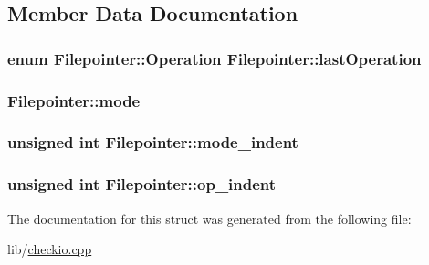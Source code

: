 \subsection{Member Data Documentation}
\hypertarget{struct_filepointer_af2d4dd45b988821f27c727858efda2a5}{
\subsubsection[{last\-Operation}]{\setlength{\rightskip}{0pt plus 5cm}enum {\bf Filepointer\-::\-Operation}  Filepointer\-::last\-Operation}}\label{struct_filepointer_af2d4dd45b988821f27c727858efda2a5}
\hypertarget{struct_filepointer_a56618b53461d3cc5281f8f2750bf109e}{
\subsubsection[{mode}]{ Filepointer\-::mode}}\label{struct_filepointer_a56618b53461d3cc5281f8f2750bf109e}
\hypertarget{struct_filepointer_af42d237df842da4a07835a7762c0ac93}{
\subsubsection[{mode\-\_\-indent}]{\setlength{\rightskip}{0pt plus 5cm}unsigned int Filepointer\-::mode\-\_\-indent}}\label{struct_filepointer_af42d237df842da4a07835a7762c0ac93}
\hypertarget{struct_filepointer_a50eadd2470a4e7561d0381a11e67c434}{
\subsubsection[{op\-\_\-indent}]{\setlength{\rightskip}{0pt plus 5cm}unsigned int Filepointer\-::op\-\_\-indent}}\label{struct_filepointer_a50eadd2470a4e7561d0381a11e67c434}


The documentation for this struct was generated from the following file\-:\begin{DoxyCompactItemize}
\item 
lib/\hyperlink{checkio_8cpp}{checkio.\-cpp}\end{DoxyCompactItemize}
